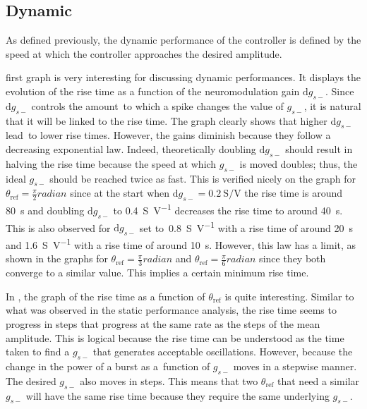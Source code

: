 \subsection{Dynamic}

As defined previously, the dynamic performance of the controller is defined by the speed at which the controller approaches the desired amplitude.

 first graph is very interesting for discussing dynamic performances.
It displays the evolution of the rise time as a function of the neuromodulation gain $\mathrm{d}g_{s-}$.
Since $\mathrm{d}g_{s-}$ controls the amount to which a spike changes the value of $g_{s-}$, it is natural that it will be linked to the rise time.
The graph clearly shows that higher $\mathrm{d}g_{s-}$ lead to lower rise times.
However, the gains diminish because they follow a decreasing exponential law.
Indeed, theoretically doubling $\mathrm{d}g_{s-}$ should result in halving the rise time because the speed at which $g_{s-}$ is moved doubles; thus, the ideal $g_{s-}$ should be reached twice as fast.
This is verified nicely on the graph for $\theta_\text{ref}=\frac{\pi}{2}\unit{radian}$ since at the start when $\mathrm{d}g_{s-} = \qty{0.2}{\siemens\per\volt}$ the rise time is around \qty{80}{\second} and doubling $\mathrm{d}g_{s-}$ to \qty{0.4}{\siemens\per\volt} decreases the rise time to around \qty{40}{\second}.
This is also observed for $\mathrm{d}g_{s-}$ set to \qty{0.8}{\siemens\per\volt} with a rise time of around \qty{20}{\second} and \qty{1.6}{\siemens\per\volt} with a rise time of around \qty{10}{\second}.
However, this law has a limit, as shown in the graphs for $\theta_\text{ref}=\frac{\pi}{3}\unit{radian}$ and $\theta_\text{ref}=\frac{\pi}{6}\unit{radian}$ since they both converge to a similar value.
This implies a certain minimum rise time.

In , the graph of the rise time as a function of $\theta_\text{ref}$ is quite interesting.
Similar to what was observed in the static performance analysis, the rise time seems to progress in steps that progress at the same rate as the steps of the mean amplitude.
This is logical because the rise time can be understood as the time taken to find a $g_{s-}$ that generates acceptable oscillations.
However, because the change in the power of a burst as a function of $g_{s-}$ moves in a stepwise manner. The desired $g_{s-}$ also moves in steps.
This means that two $\theta_\text{ref}$ that need a similar $g_{s-}$ will have the same rise time because they require the same underlying $g_{s-}$.

